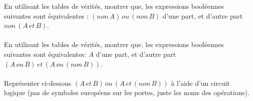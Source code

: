 \documentclass[a4paper,12pt]{article}
\begin{document}
	
	En utilisant les tables de vérités, montrer que, les expressions booléennes suivantes sont équivalentes :
	$(non\, A)\, ou\, (non\, B)$ d'une part, et d'autre part $non\, (A\, et\, B)$.\\
	
	\\
	
	En utilisant les tables de vérités, montrer que, les expressions booléennes suivantes sont équivalentes:
	$A$ d'une part, et d'autre part $(A\,ou\,B)\,et\,(A\,ou\,(non\,B))$.\\
	
	
	\\
	
	Représenter ci-dessous $(A\,et\,B)\,ou\,(A\,et\,(non\,B))$ à l'aide d'un circuit logique (pas de symboles européens sur les portes, juste les noms des opérations).\\
	
\end{document}
